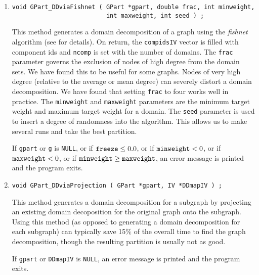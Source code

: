 \begin{enumerate}
\item
\begin{verbatim}
void GPart_DDviaFishnet ( GPart *gpart, double frac, int minweight,
                          int maxweight, int seed ) ;
\end{verbatim}
This method generates a domain decomposition of a graph using the
{\it fishnet} algorithm (see \cite{ash97-DDSEP} for details).
On return, the {\tt compidsIV} vector is filled with component ids
and {\tt ncomp} is set with the number of domains.
The {\tt frac} parameter governs the exclusion of nodes of high
degree from the domain sets.
We have found this to be useful for some graphs.
Nodes of very high degree (relative to the average or mean degree)
can severely distort a domain decomposition.
We have found that setting {\tt frac} to four works well in
practice.
The {\tt minweight} and {\tt maxweight} parameters are the minimum
target weight and maximum target weight for a domain.
The {\tt seed} parameter is used to insert a degree of randomness
into the algorithm.
This allows us to make several runs and take the best partition.
\par {}
If {\tt gpart} or {\tt g} is {\tt NULL},
or if ${\tt freeze} \le 0.0$,
or if ${\tt minweight} < 0$,
or if ${\tt maxweight} < 0$,
or if ${\tt minweight} \ge {\tt maxweight}$,
an error message is printed and the program exits.
\item
\begin{verbatim}
void GPart_DDviaProjection ( GPart *gpart, IV *DDmapIV ) ;
\end{verbatim}
This method generates a domain decomposition for a subgraph by
projecting an existing domain decoposition for the original graph
onto the subgraph.
Using this method (as opposed to generating a domain decomposition
for each subgraph) can typically save 15\% of the overall time
to find the graph decomposition, though the resulting partition is
usually not as good.
\par {}
If {\tt gpart} or {\tt DDmapIV} is {\tt NULL},
an error message is printed and the program exits.
\end{enumerate}
\par
